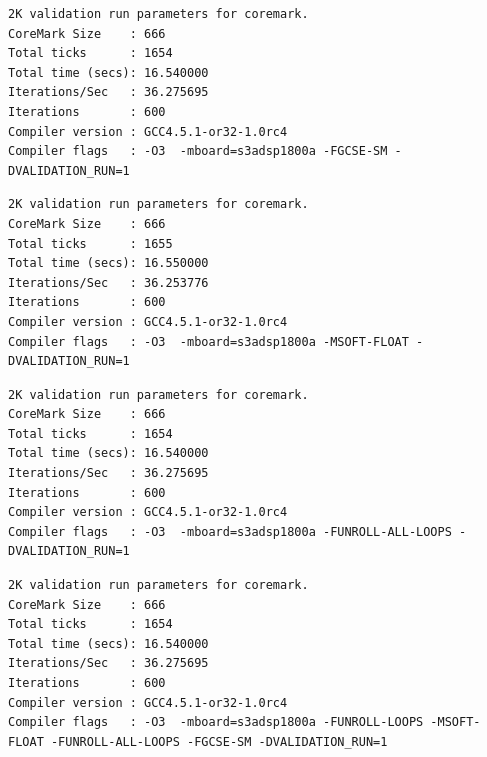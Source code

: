 \begin{lstlisting}[frame=single,caption={Optimización nivel -O3 - Flags activos -FGCSE-SM},label={lst:salidas},breaklines]
2K validation run parameters for coremark.
CoreMark Size    : 666
Total ticks      : 1654
Total time (secs): 16.540000
Iterations/Sec   : 36.275695
Iterations       : 600
Compiler version : GCC4.5.1-or32-1.0rc4
Compiler flags   : -O3  -mboard=s3adsp1800a -FGCSE-SM -DVALIDATION_RUN=1  
\end{lstlisting}

\begin{lstlisting}[frame=single,caption={Optimización nivel -O3 - Flags activos -MSOFT-FLOAT},label={lst:salidas},breaklines]
2K validation run parameters for coremark.
CoreMark Size    : 666
Total ticks      : 1655
Total time (secs): 16.550000
Iterations/Sec   : 36.253776
Iterations       : 600
Compiler version : GCC4.5.1-or32-1.0rc4
Compiler flags   : -O3  -mboard=s3adsp1800a -MSOFT-FLOAT -DVALIDATION_RUN=1  
\end{lstlisting}

\begin{lstlisting}[frame=single,caption={Optimización nivel -O3 - Flags activos -FUNROLL-ALL-LOOPS},label={lst:salidas},breaklines]
2K validation run parameters for coremark.
CoreMark Size    : 666
Total ticks      : 1654
Total time (secs): 16.540000
Iterations/Sec   : 36.275695
Iterations       : 600
Compiler version : GCC4.5.1-or32-1.0rc4
Compiler flags   : -O3  -mboard=s3adsp1800a -FUNROLL-ALL-LOOPS -DVALIDATION_RUN=1  
\end{lstlisting}

\begin{lstlisting}[frame=single,caption={Optimización nivel -O3 - Flags activos -FUNROLL-LOOPS -MSOFT-FLOAT
-FUNROLL-ALL-LOOPS -FGCSE-SM},label={lst:salidas},breaklines]
2K validation run parameters for coremark.
CoreMark Size    : 666
Total ticks      : 1654
Total time (secs): 16.540000
Iterations/Sec   : 36.275695
Iterations       : 600
Compiler version : GCC4.5.1-or32-1.0rc4
Compiler flags   : -O3  -mboard=s3adsp1800a -FUNROLL-LOOPS -MSOFT-FLOAT -FUNROLL-ALL-LOOPS -FGCSE-SM -DVALIDATION_RUN=1  
\end{lstlisting}


